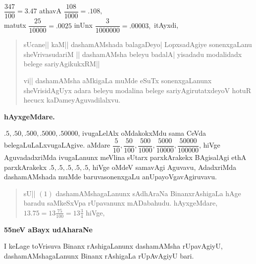 $\dfrac{347}{100}=3.47$ athavA $\dfrac{108}{1000}=.108,$\\

matutx $\dfrac{25}{10000}=.0025$ inUnx $\dfrac{3}{1000000}=.00003,$ itAyxdi,\\

\begin{verse}
sUcane|| kaM|| dashamAMshada balagaDeyo| LopxsadAgiye sonenxgaLanu sheVrivasudariM || dashamAMsha beleyu badalA| yisadadu modalidadx belege sariyAgikukxRM||

vi|| dashamAMsha aMkigaLa muMde eSuTx sonenxgaLanunx sheVrisidAgUyx adara beleyu modalina belege sariyAgirutatxdeyoV hotuR hecucx kaDameyAguvadilalxvu.
\end{verse}


\begin{center}
{\large\bf hAyxgeMdare.}
\end{center}

$.5, .50, .500, .5000, .50000$, ivugaLelAlx oMdakokxMdu sama CeVda belegaLuLaLxvugaLAgive. aMdare $\dfrac{5}{10}, \dfrac{50}{100}, \dfrac{500}{1000}, \dfrac{5000}{10000}, \dfrac{50000}{100000}$, hiVge
 AguvadadxriMda ivugaLanunx meVlina sUtarx parxkArakekx BAgi\-salAgi ethA parxkArakekx $.5, .5, .5, .5, .5$, hiVge oMdeV samavAgi Aguvavu, AdadxriMda dashamAMshada muMde baruva\break sonenxgaLu anUpayoVgavAgiruvavu.

\begin{verse}
sU|| $(1)$ dashamAMshagaLanunx sAdhAraNa BinanxrAshigaLa hAge baradu saMkeSxVpa rUpavanunx mADabahudu. hAyxgeMdare, $13.75=13 \tfrac{75}{100}=13\tfrac{3}{4}$ hiVge,
\end{verse}

\bigskip

\begin{center}
{\bf\Large 55neV aBayx udAharaNe}
\end{center}

I keLage toVrisuva Binanx rAshigaLanunx dashamAMsha rUpavAgiyU, dashamAMshagaLanunx Binanx rAshigaLa rUpAvAgiyU bari.

